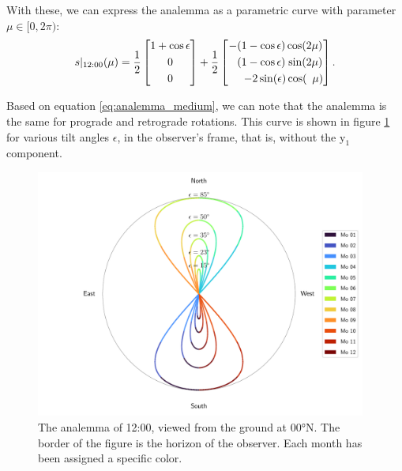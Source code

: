 \documentclass[12pt]{article}
\newcommand{\Sin}{%
  \mathop{\sbox0{$\cos$}\makebox[\wd0][r]{$\sin$}}%
}
\begin{document}
With these, we can express the analemma as a 
parametric curve with parameter 
$\mu \in [0,2\pi)$:
\begin{equation}
    s\vert_{12:00}(\mu) =
    \frac{1}{2}
    \begin{bmatrix}
        1+\cos\epsilon\\[3pt]
        0\\[3pt]
        0
    \end{bmatrix}+
    \frac{1}{2}
    \begin{bmatrix}
        - (1-\cos\epsilon) \cos(2\mu)\\[3pt]
        \phantom{-}(1-\cos\epsilon) \Sin(2\mu)\\[3pt]
        \quad\;\,-2\sin(\epsilon) \cos(\phantom{2}\mu)
    \end{bmatrix}.
    \label{eq:analemma_medium}
\end{equation}

Based on equation \eqref{eq:analemma_medium}, we can note that the analemma is 
the same for prograde and retrograde rotations. 
This curve is shown in figure \ref{fig:analemma_easy} for various 
tilt angles $\epsilon$, in the observer's frame, that is, without the 
$\mathrm{y}_1$ component. 

\begin{figure}[ht]
    \centering
    \includegraphics[width=0.97\textwidth]{./analemma_plot.pdf}
    \caption{
        The analemma of 12:00, viewed from the ground at 00°N. 
        The border of the figure is the horizon of the observer. 
        Each month has been assigned a specific color.
    }
    \label{fig:analemma_easy}
\end{figure}
\end{document}
